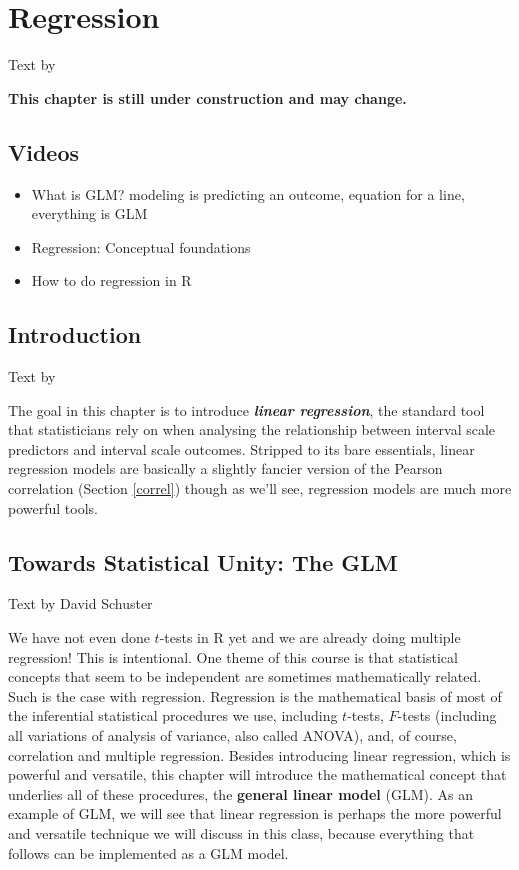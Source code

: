 \documentclass[
]{book}
\providecommand{\tightlist}{%
  \setlength{\itemsep}{0pt}\setlength{\parskip}{0pt}}
\begin{document}
\hypertarget{regression}{%
\chapter{Regression}\label{regression}}

Text by \citet{Navarro2018}

\textbf{This chapter is still under construction and may change.}

\hypertarget{videos-6}{%
\section{Videos}\label{videos-6}}

\begin{itemize}
\tightlist
\item
  What is GLM? modeling is predicting an outcome, equation for a line, everything is GLM
\item
  Regression: Conceptual foundations
\item
  How to do regression in R
\end{itemize}

\hypertarget{introduction-5}{%
\section{Introduction}\label{introduction-5}}

Text by \citet{Navarro2018}

The goal in this chapter is to introduce \textbf{\emph{linear regression}}, the standard tool that statisticians rely on when analysing the relationship between interval scale predictors and interval scale outcomes. Stripped to its bare essentials, linear regression models are basically a slightly fancier version of the Pearson correlation (Section \ref{correl}) though as we'll see, regression models are much more powerful tools.

\hypertarget{towards-statistical-unity-the-glm}{%
\section{Towards Statistical Unity: The GLM}\label{towards-statistical-unity-the-glm}}

Text by David Schuster

We have not even done \(t\)-tests in R yet and we are already doing multiple regression! This is intentional. One theme of this course is that statistical concepts that seem to be independent are sometimes mathematically related. Such is the case with regression. Regression is the mathematical basis of most of the inferential statistical procedures we use, including \(t\)-tests, \(F\)-tests (including all variations of analysis of variance, also called ANOVA), and, of course, correlation and multiple regression. Besides introducing linear regression, which is powerful and versatile, this chapter will introduce the mathematical concept that underlies all of these procedures, the \textbf{general linear model} (GLM). As an example of GLM, we will see that linear regression is perhaps the more powerful and versatile technique we will discuss in this class, because everything that follows can be implemented as a GLM model.
\end{document}
